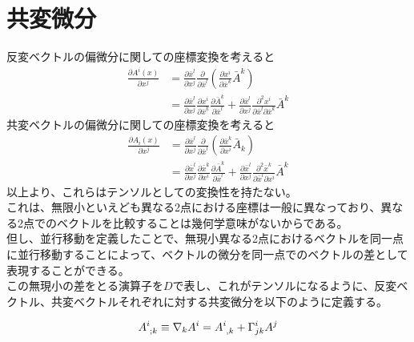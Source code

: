\documentclass[dvipdfmx]{report} %
\begin{document}
\section{
    共変微分
}
反変ベクトルの偏微分に関しての座標変換を考えると
\begin{equation*}
\begin{split}
\frac{ \partial A^i(x) }{ \partial x^j } &= \frac{ \partial \bar{x}^l }{ \partial x^j } \frac{ \partial }{ \partial \bar{x}^l } \left( \frac{ \partial x^i }{ \partial \bar{x}^k } \bar{A}^k  \right)\\
&= \frac{\partial \bar{x}^l}{\partial{x}^j} \frac{\partial{x}^i}{\partial \bar{x}^k} \frac{\partial \bar{A}^k}{\partial \bar{x}^l} + \frac{\partial \bar{x}^l}{\partial x^j} \frac{\partial^2 x^i}{\partial \bar{x}^l \partial \bar{x}^k} \bar{A}^k
\end{split}
\end{equation*}
共変ベクトルの偏微分に関しての座標変換を考えると
\begin{equation*}
\begin{split}
\frac{ \partial A_i(x) }{ \partial x^j } &= \frac{ \partial \bar{x}^l }{ \partial x^j } \frac{ \partial }{ \partial \bar{x}^l } \left( \frac{ \partial \bar{x}^k }{ \partial x^i } \bar{A}_k  \right)\\
&= \frac{\partial \bar{x}^l}{\partial{x}^j} \frac{\partial \bar{x}^k}{\partial x^i} \frac{\partial \bar{A}^k}{\partial \bar{x}^l} + \frac{\partial \bar{x}^l}{\partial x^j} \frac{\partial^2 \bar{x}^k}{\partial \bar{x}^l \partial x^i} \bar{A}^k
\end{split}
\end{equation*}
以上より、これらはテンソルとしての変換性を持たない。\\
これは、無限小といえども異なる2点における座標は一般に異なっており、異なる2点でのベクトルを比較することは幾何学意味がないからである。\\
但し、並行移動を定義したことで、無現小異なる2点におけるベクトルを同一点に並行移動することによって、ベクトルの微分を同一点でのベクトルの差として表現することができる。\\
この無現小の差をとる演算子を$D$で表し、これがテンソルになるように、反変ベクトル、共変ベクトルそれぞれに対する共変微分を以下のように定義する。
\begin{tcolorbox}[title=反変ベクトルに対する共変微分]
\begin{equation*}
\begin{split}
\tensor{A}{^i_{;k}} \equiv \nabla_k A^i = \tensor{A}{^i_{,k}} + \Gamma^{i}_{jk}A^j
\end{split}
\end{equation*}
\end{tcolorbox}
\end{document}
